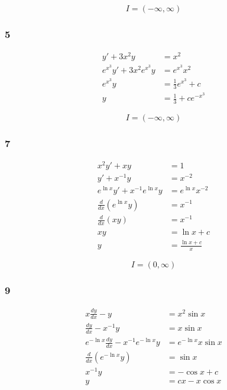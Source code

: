 \documentclass{article}
\begin{document}
\[I = (-\infty, \infty)\]

\subsubsection{5}

\begin{align*}
  y' + 3 x^2 y                 & = x^2                      \\
  e^{x^3} y' + 3 x^2 e^{x^3} y & = e^{x^3} x^2              \\
  e^{x^3} y                    & = \frac{1}{3} e^{x^3} + c  \\
  y                            & = \frac{1}{3} + c e^{-x^3}
\end{align*}

\[I = (-\infty, \infty)\]

\subsubsection{7}

\begin{align*}
  x^2 y' + x y                      & = 1                   \\
  y' + x^{-1} y                     & = x^{-2}              \\
  e^{\ln x} y' + x^{-1} e^{\ln x} y & = e^{\ln x} x^{-2}    \\
  \frac{d}{d x} (e^{\ln x} y)       & = x^{-1}              \\
  \frac{d}{d x} (x y)               & = x^{-1}              \\
  x y                               & = \ln x + c           \\
  y                                 & = \frac{\ln x + c}{x}
\end{align*}

\[I = (0, \infty)\]

\subsubsection{9}

\begin{align*}
  x \frac{d y}{d x} - y                            & = x^2 \sin x          \\
  \frac{d y}{d x} - x^{-1} y                       & = x \sin x            \\
  e^{-\ln x} \frac{d y}{d x} - x^{-1} e^{-\ln x} y & = e^{-\ln x} x \sin x \\
  \frac{d}{d x} (e^{-\ln x} y)                     & = \sin x              \\
  x^{-1} y                                         & = -\cos x + c         \\
  y                                                & = c x - x \cos x
\end{align*}
\end{document}
